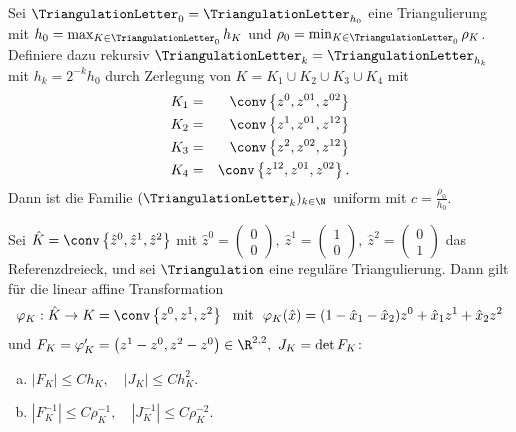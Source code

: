 \begin{Beispiel}
    Sei $\TriangulationLetter_0 = \TriangulationLetter_{h_0}$ eine Triangulierung mit
    $h_0 = \max_{K\in\TriangulationLetter_0} h_K$ und $\rho_0 = \min_{K\in\TriangulationLetter_0}
    \rho_K$. Definiere dazu rekursiv $\TriangulationLetter_k = \TriangulationLetter_{h_k}$ mit
    $h_k = 2^{-k} h_0$ durch Zerlegung von $K = K_1 \cup K_2 \cup K_3 \cup
    K_4$ mit
    \begin{eqnarray*}
        K_1 &=& \conv\left\{z^0, z^{01}, z^{02}\right\} \\
        K_2 &=& \conv\left\{z^1, z^{01}, z^{12}\right\} \\
        K_3 &=& \conv\left\{z^2, z^{02}, z^{12}\right\} \\
        K_4 &=& \conv\left\{z^{12}, z^{01}, z^{02}\right\}.
    \end{eqnarray*}
    Dann ist die Familie $(\TriangulationLetter_k)_{k\in\N}$ uniform mit $ c =
    \frac{\rho_0}{h_0}$.
\end{Beispiel}


\begin{Lemma}
    \label{lem:3.10}
    Sei $\hat K = \conv\left\{\hat z^0, \hat z^1, \hat z^2\right\}$ mit
    $\hat z^0 = \left(\begin{smallmatrix} 0 \\ 0 \end{smallmatrix}\right), \
     \hat z^1 = \left(\begin{smallmatrix} 1 \\ 0 \end{smallmatrix}\right), \
     \hat z^2 = \left(\begin{smallmatrix} 0 \\ 1 \end{smallmatrix}\right)$
    das Referenzdreieck, und sei $\Triangulation$ eine reguläre
    Triangulierung. Dann gilt für die linear affine Transformation
    \begin{eqnarray*}
        \varphi_K: \hat K \to K = \conv\left\{z^0, z^1, z^2\right\} \
        \text{ mit }
        \ \varphi_K (\hat x) = (1 - \hat x_1 - \hat x_2) z^0 + \hat x_1 z^1
        + \hat x_2 z^2
    \end{eqnarray*}
    und $F_K = \varphi_K^\prime = \left(z^1 - z^0, z^2 - z^0\right)\in
    \R^{2,2}, \ J_K = \det F_K$:
    \begin{enumerate}[a)]
      \item
        $|F_K| \le C h_K,
        \quad
        |J_K| \le C h_K^2$.
      \item
        $\left|F_K^{-1}\right| \le C \rho_K^{-1},
        \quad
        \left|J_K^{-1}\right| \le C \rho_K^{-2}$.
    \end{enumerate}
\end{Lemma}


